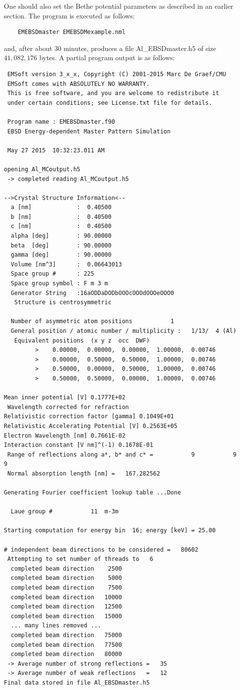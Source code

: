 \documentclass[DIV=calc, paper=letter, fontsize=11pt]{scrartcl}	 %
\begin{document}
One should also set the Bethe potential parameters as described in an earlier section.  The program is executed as follows:
\begin{verbatim}
	EMEBSDmaster EMEBSDMexample.nml
\end{verbatim}
and, after about $30$ minutes, produces a file \textsf{Al\_EBSDmaster.h5} of size $41,082,176$ bytes.  A partial program output
is as follows:
\begin{verbatim}
 EMSoft version 3_x_x, Copyright (C) 2001-2015 Marc De Graef/CMU
 EMSoft comes with ABSOLUTELY NO WARRANTY.
 This is free software, and you are welcome to redistribute it
 under certain conditions; see License.txt file for details.

 Program name : EMEBSDmaster.f90
 EBSD Energy-dependent Master Pattern Simulation

 May 27 2015  10:32:23.011 AM

opening Al_MCoutput.h5
 -> completed reading Al_MCoutput.h5

-->Crystal Structure Information<--
  a [nm]             :  0.40500
  b [nm]             :  0.40500
  c [nm]             :  0.40500
  alpha [deg]        : 90.00000
  beta  [deg]        : 90.00000
  gamma [deg]        : 90.00000
  Volume [nm^3]      :  0.06643013
  Space group #      : 225
  Space group symbol : F m 3 m
  Generator String   :16aODDaDODbOOOcOOOdOOOeOOO0
   Structure is centrosymmetric

  Number of asymmetric atom positions           1
  General position / atomic number / multiplicity :   1/13/  4 (Al)
   Equivalent positions  (x y z  occ  DWF)
         >    0.00000,  0.00000,  0.00000,  1.00000,  0.00746
         >    0.00000,  0.50000,  0.50000,  1.00000,  0.00746
         >    0.50000,  0.00000,  0.50000,  1.00000,  0.00746
         >    0.50000,  0.50000,  0.00000,  1.00000,  0.00746

Mean inner potential [V] 0.1777E+02
 Wavelength corrected for refraction
Relativistic correction factor [gamma] 0.1049E+01
Relativistic Accelerating Potential [V] 0.2563E+05
Electron Wavelength [nm] 0.7661E-02
Interaction constant [V nm]^(-1) 0.1678E-01
 Range of reflections along a*, b* and c* =           9           9           9
 Normal absorption length [nm] =   167.282562    

Generating Fourier coefficient lookup table ...Done

  Laue group #           11  m-3m

Starting computation for energy bin  16; energy [keV] = 25.00

# independent beam directions to be considered =   80602
 Attempting to set number of threads to   6
  completed beam direction    2500
  completed beam direction    5000
  completed beam direction    7500
  completed beam direction   10000
  completed beam direction   12500
  completed beam direction   15000
  ... many lines removed ...
  completed beam direction   75000
  completed beam direction   77500
  completed beam direction   80000
 -> Average number of strong reflections =   35
 -> Average number of weak reflections   =   12
Final data stored in file Al_EBSDmaster.h5
\end{verbatim}
\end{document}
